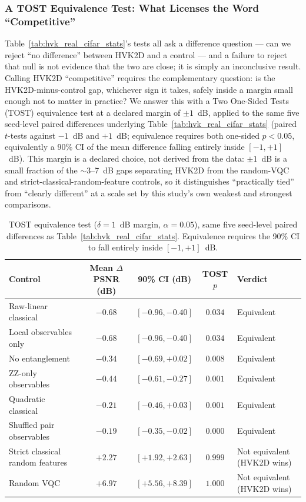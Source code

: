\documentclass[11pt]{article}
\begin{document}
\subsubsection{A TOST Equivalence Test: What Licenses the Word ``Competitive''}
\label{sec:tost_equivalence}
Table~\ref{tab:hvk_real_cifar_stats}'s tests all ask a difference question --- can we reject ``no difference'' between HVK2D and a control --- and a failure to reject that null is not evidence that the two are close; it is simply an inconclusive result. Calling HVK2D ``competitive'' requires the complementary question: is the HVK2D-minus-control gap, whichever sign it takes, safely inside a margin small enough not to matter in practice? We answer this with a Two One-Sided Tests (TOST) equivalence test \cite{Schuirmann1987TOST,Lakens2017TOST} at a declared margin of $\pm1$~dB, applied to the same five seed-level paired differences underlying Table~\ref{tab:hvk_real_cifar_stats} (paired $t$-tests against $-1$~dB and $+1$~dB; equivalence requires both one-sided $p<0.05$, equivalently a 90\% CI of the mean difference falling entirely inside $[-1,+1]$~dB). This margin is a declared choice, not derived from the data: $\pm1$~dB is a small fraction of the $\sim$3--7~dB gaps separating HVK2D from the random-VQC and strict-classical-random-feature controls, so it distinguishes ``practically tied'' from ``clearly different'' at a scale set by this study's own weakest and strongest comparisons.

\begin{table}[H]
\centering
\caption{TOST equivalence test ($\delta=1$~dB margin, $\alpha=0.05$), same five seed-level paired differences as Table~\ref{tab:hvk_real_cifar_stats}. Equivalence requires the 90\% CI to fall entirely inside $[-1,+1]$~dB.}
\label{tab:tost_equivalence}
\scriptsize
\begin{tabular}{lcccl}
\toprule
Control & Mean $\Delta$PSNR (dB) & 90\% CI (dB) & TOST $p$ & Verdict \\
\midrule
Raw-linear classical & $-0.68$ & $[-0.96,-0.40]$ & $0.034$ & Equivalent \\
Local observables only & $-0.68$ & $[-0.96,-0.40]$ & $0.034$ & Equivalent \\
No entanglement & $-0.34$ & $[-0.69,+0.02]$ & $0.008$ & Equivalent \\
ZZ-only observables & $-0.44$ & $[-0.61,-0.27]$ & $0.001$ & Equivalent \\
Quadratic classical & $-0.21$ & $[-0.46,+0.03]$ & $0.001$ & Equivalent \\
Shuffled pair observables & $-0.19$ & $[-0.35,-0.02]$ & $0.000$ & Equivalent \\
Strict classical random features & $+2.27$ & $[+1.92,+2.63]$ & $0.999$ & Not equivalent (HVK2D wins) \\
Random VQC & $+6.97$ & $[+5.56,+8.39]$ & $1.000$ & Not equivalent (HVK2D wins) \\
\bottomrule
\end{tabular}
\end{table}
\end{document}
